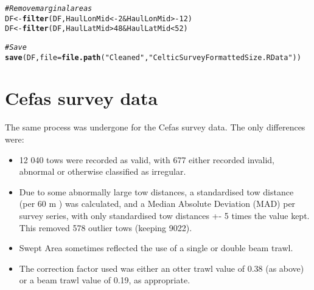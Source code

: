 \documentclass[12pt]{article}\usepackage[]{graphicx}\usepackage[]{color}
\makeatletter
\newcommand{\hlnum}[1]{\textcolor[rgb]{0.686,0.059,0.569}{#1}}%
\newcommand{\hlstr}[1]{\textcolor[rgb]{0.192,0.494,0.8}{#1}}%
\newcommand{\hlcom}[1]{\textcolor[rgb]{0.678,0.584,0.686}{\textit{#1}}}%
\newcommand{\hlopt}[1]{\textcolor[rgb]{0,0,0}{#1}}%
\newcommand{\hlstd}[1]{\textcolor[rgb]{0.345,0.345,0.345}{#1}}%
\newcommand{\hlkwb}[1]{\textcolor[rgb]{0.69,0.353,0.396}{#1}}%
\newcommand{\hlkwc}[1]{\textcolor[rgb]{0.333,0.667,0.333}{#1}}%
\newcommand{\hlkwd}[1]{\textcolor[rgb]{0.737,0.353,0.396}{\textbf{#1}}}%
\newenvironment{kframe}{%
 \def\at@end@of@kframe{}%
 \ifinner\ifhmode%
  \def\at@end@of@kframe{\end{minipage}}%
  \begin{minipage}{\columnwidth}%
 \fi\fi%
 \def\FrameCommand##1{\hskip\@totalleftmargin \hskip-\fboxsep
 \colorbox{shadecolor}{##1}\hskip-\fboxsep
     \hskip-\linewidth \hskip-\@totalleftmargin \hskip\columnwidth}%
 \MakeFramed {\advance\hsize-\width
   \@totalleftmargin\z@ \linewidth\hsize
   \@setminipage}}%
 {\par\unskip\endMakeFramed%
 \at@end@of@kframe}
\newenvironment{knitrout}{}{} %
\makeatother
\begin{document}
\begin{knitrout}
\begin{kframe}
\begin{alltt}
\hlcom{# Remove marginal areas}
\hlstd{DF} \hlkwb{<-} \hlkwd{filter}\hlstd{(DF, HaulLonMid} \hlopt{< -}\hlnum{2} \hlopt{&} \hlstd{HaulLonMid} \hlopt{> -}\hlnum{12}\hlstd{)}
\hlstd{DF} \hlkwb{<-} \hlkwd{filter}\hlstd{(DF, HaulLatMid} \hlopt{>} \hlnum{48} \hlopt{&} \hlstd{HaulLatMid} \hlopt{<} \hlnum{52}\hlstd{)}

\hlcom{# Save}
\hlkwd{save}\hlstd{(DF,} \hlkwc{file} \hlstd{=} \hlkwd{file.path}\hlstd{(}\hlstr{"Cleaned"}\hlstd{,} \hlstr{"CelticSurveyFormattedSize.RData"}\hlstd{))}
\end{alltt}
\end{kframe}
\end{knitrout}

\section{Cefas survey data}

The same process was undergone for the Cefas survey data. The only differences
were:

\begin{itemize}
	\item 12 040 tows were recorded as valid, with 677 either recorded
		invalid, abnormal or otherwise classified as irregular.
	\item Due to some abnormally large tow distances, a standardised tow
		distance (per 60 m ) was calculated, and a Median Absolute
		Deviation (MAD) per survey series, with only standardised tow
		distances +- 5 times the value kept. This removed 578 outlier
		tows (keeping 9022).
	\item Swept Area sometimes reflected the use of a single or double beam
		trawl.
	\item The correction factor used was either an otter trawl value of
		0.38 (as above) or a beam trawl value of 0.19, as appropriate.
\end{itemize}
\end{document}
